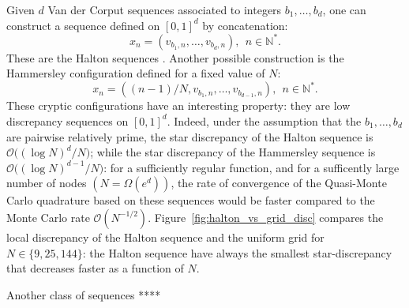 \documentclass[twoside,11pt]{book}
\newtheorem{definition}{Definition}
\numberwithin{theorem}{chapter}
\numberwithin{definition}{chapter}
\numberwithin{proposition}{chapter}
\numberwithin{corollary}{chapter}
\numberwithin{example}{chapter}
\numberwithin{lemma}{chapter}
\numberwithin{assumption}{chapter}
\begin{document}
Given $d$ Van der Corput sequences associated to integers $b_{1}, \dots , b_{d}$, one can construct a sequence defined on $[0,1]^{d}$ by concatenation:
\begin{equation}
x_{n} = (v_{b_1,n}, \dots, v_{b_d,n}), \:\: n \in \mathbb{N}^{*}.
\end{equation}
These are the Halton sequences \citep{Hal64}. Another possible construction is the Hammersley configuration defined for a fixed value of $N$:
\begin{equation}
x_{n} = ((n-1)/N,v_{b_1,n}, \dots, v_{b_{d-1},n}), \:\: n \in \mathbb{N}^{*}.
\end{equation}
These cryptic configurations have an interesting property: they are low discrepancy sequences on $[0,1]^{d}$. Indeed, under the assumption that the $b_{1}, \dots, b_{d}$ are pairwise relatively prime, the star discrepancy of the Halton sequence is $\displaystyle \mathcal{O}\big((\log N)^{d}/N \big)$; while the star discrepancy of the Hammersley sequence is $\displaystyle \mathcal{O} \big((\log N)^{d-1}/N \big)$: for a sufficiently regular function, and for a sufficently large number of nodes $(N = \Omega(e^{d}))$, the rate of convergence of the Quasi-Monte Carlo quadrature based on these sequences would be faster compared to the Monte Carlo rate $\mathcal{O}(N^{-1/2})$. Figure~\ref{fig:halton_vs_grid_disc} compares the local discrepancy of the Halton sequence and the uniform grid for $N \in \{9,25,144\}$: the Halton sequence have always the smallest star-discrepancy that decreases faster as a function of $N$. 

Another class of sequences ****









\end{document}
